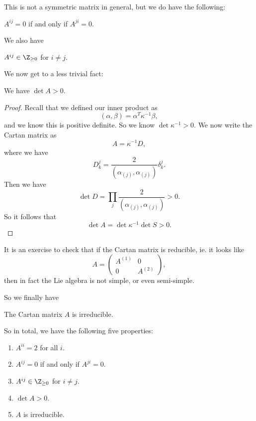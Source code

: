 \documentclass[a4paper]{article}
\begin{document}
This is not a symmetric matrix in general, but we do have the following:
\begin{prop}
  $A^{ij} = 0$ if and only if $A^{ji} = 0$.
\end{prop}

We also have
\begin{prop}
  $A^{ij} \in \Z_{\geq 0}$ for $i \not= j$.
\end{prop}

We now get to a less trivial fact:
\begin{prop}
  We have $\det A > 0$.
\end{prop}

\begin{proof}
  Recall that we defined our inner product as
  \[
    (\alpha, \beta) = \alpha^T \kappa^{-1} \beta,
  \]
  and we know this is positive definite. So we know $\det \kappa^{-1} > 0$. We now write the Cartan matrix as
  \[
    A = \kappa^{-1}D,
  \]
  where we have
  \[
    D_k^j = \frac{2}{(\alpha_{(j)}, \alpha_{(j)})} \delta^j_k.
  \]
  Then we have
  \[
    \det D = \prod_j \frac{2}{(\alpha_{(j)}, \alpha_{(j)})} > 0.
  \]
  So it follows that 
  \[
    \det A = \det \kappa^{-1} \det S > 0.
  \]
\end{proof}

It is an exercise to check that if the Cartan matrix is reducible, ie. it looks like
\[
  A = 
  \begin{pmatrix}
    A^{(1)} & 0\\
    0 & A^{(2)}
  \end{pmatrix},
\]
then in fact the Lie algebra is not simple, or even semi-simple.

So we finally have
\begin{prop}
  The Cartan matrix $A$ is irreducible.
\end{prop}

So in total, we have the following five properties:
\begin{prop}\leavevmode
  \begin{enumerate}
    \item $A^{ii} = 2$ for all $i$.
    \item $A^{ij} = 0$ if and only if $A^{ji} = 0$.
    \item $A^{ij} \in \Z_{\geq 0}$ for $i \not= j$.
    \item $\det A > 0$.
    \item $A$ is irreducible.
  \end{enumerate}
\end{prop}
\end{document}

